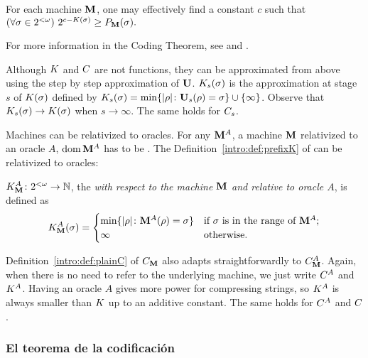 \begin{teorema}\label{intro:thm:coding} For each \pfree machine ${\bf M}$, one
may effectively find a constant $c$ such that $ (\forall
\sigma\in2^{<\omega})\ 2^{c-K(\sigma)}\geq P_{{\bf M}}(\sigma). $
\end{teorema}
For more information in the Coding Theorem, see \cite{LV97} and
\cite{DHBook}.

\bigskip

 Although $K$ and $C$ are not \comp functions,
they can be \recly approximated from above using the step by step
approximation of ${\bf U}$. $K_s(\sigma)$ is the
approximation at stage $s$ of $K(\sigma)$ defined by
$K_s(\sigma)=\min\{| \rho |\colon
{\bf U}_s(\rho)=\sigma\}\cup\{\infty\}$. Observe that
$K_s(\sigma)\to K(\sigma)$ when $s\to\infty$.
 The same holds for
${C_s}$.


Machines can be relativized to oracles. For any ${\bf M}^A$, a \pfree
machine ${\bf M}$ relativized to an oracle $A$, $\domain {\M^A}$ has to
be \pfree. The Definition~\ref{intro:def:prefixK} of \kolcomp can
be relativized to oracles:

\begin{definicion}\label{intro:def:prefixKwithOracle}
$K_{{\bf M}}^A\colon2^{<\omega} \to \mathbb{N}$, the {\em \pfree
\kolcomp with respect to the \pfree machine ${\bf M}$ and relative to
oracle $A$}, is defined as
$$
K_{{\bf M}}^A(\sigma)=
    \begin{cases}
    \min \{| \rho |\colon {\bf M}^A(\rho)=\sigma \} & \textrm{if $\sigma$ is in the range of ${\bf M}^A$};\\
    \infty & \textrm{otherwise.}
    \end{cases}
$$
\end{definicion}

Definition~\ref{intro:def:plainC} of $C_{{\bf M}}$ also adapts
straightforwardly to $C_{{\bf M}}^A$. Again, when there
is no need to refer to the underlying \opt machine, we just write
$C^A$ and $K^A$. Having an
oracle $A$ gives more power for compressing strings, so $K^A$ is
always smaller than $K$ up to an additive constant. The same
holds for $C^A$ and $C$.


\subsubsection{El teorema de la codificación}


